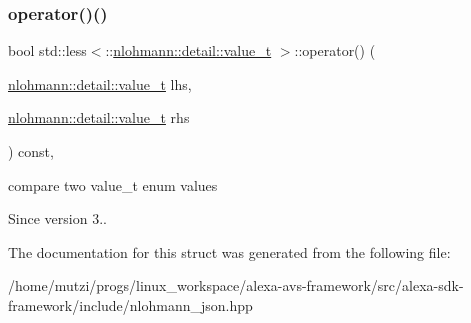 \subsubsection{\texorpdfstring{operator()()}{operator()()}}
{\footnotesize\ttfamily bool std\+::less$<$\+::\hyperlink{namespacenlohmann_1_1detail_a90aa5ef615aa8305e9ea20d8a947980f}{nlohmann\+::detail\+::value\+\_\+t} $>$\+::operator() (\begin{DoxyParamCaption}\item[{\hyperlink{namespacenlohmann_1_1detail_a90aa5ef615aa8305e9ea20d8a947980f}{nlohmann\+::detail\+::value\+\_\+t}}]{lhs,  }\item[{\hyperlink{namespacenlohmann_1_1detail_a90aa5ef615aa8305e9ea20d8a947980f}{nlohmann\+::detail\+::value\+\_\+t}}]{rhs }\end{DoxyParamCaption}) const\hspace{0.3cm}{\ttfamily [inline]}, {\ttfamily [noexcept]}}



compare two value\+\_\+t enum values 

\begin{DoxySince}{Since}
version 3.. 
\end{DoxySince}


The documentation for this struct was generated from the following file\+:\begin{DoxyCompactItemize}
\item 
/home/mutzi/progs/linux\+\_\+workspace/alexa-\/avs-\/framework/src/alexa-\/sdk-\/framework/include/nlohmann\+\_\+json.\+hpp\end{DoxyCompactItemize}
